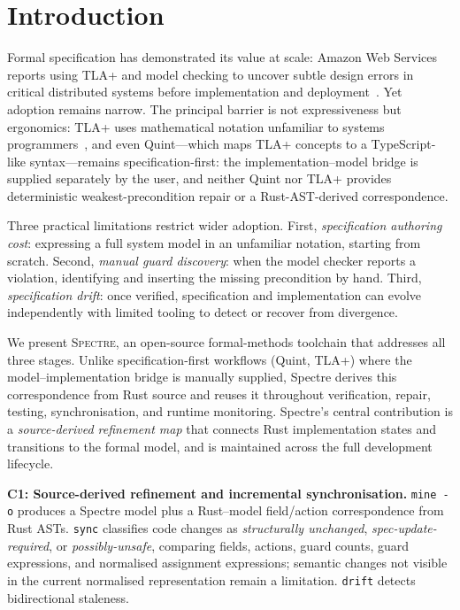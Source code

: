 \documentclass[runningheads]{llncs}
\begin{document}
\section{Introduction}\label{sec:intro}

Formal specification has demonstrated its value at scale: Amazon Web Services
reports using TLA+ and model checking to uncover subtle design errors in
critical distributed systems before implementation and deployment~\cite{newcombe2015amazon}.
Yet adoption remains narrow.
The principal barrier is not expressiveness but ergonomics: TLA+ uses
mathematical notation unfamiliar to systems programmers~\cite{wing1990specifier},
and even Quint---which maps TLA+ concepts to a TypeScript-like syntax---remains
specification-first: the implementation--model bridge is supplied separately by
the user, and neither Quint nor TLA+ provides deterministic weakest-precondition
repair or a Rust-AST-derived correspondence.

Three practical limitations restrict wider adoption.
First, \emph{specification authoring cost}: expressing a full system model in
an unfamiliar notation, starting from scratch.
Second, \emph{manual guard discovery}: when the model checker reports a
violation, identifying and inserting the missing precondition by hand.
Third, \emph{specification drift}: once verified, specification and
implementation can evolve independently with limited tooling to detect or
recover from divergence.

We present \textsc{Spectre}, an open-source formal-methods toolchain that
addresses all three stages.
Unlike specification-first workflows (Quint, TLA+) where the
model--implementation bridge is manually supplied, Spectre derives this
correspondence from Rust source and reuses it throughout verification, repair,
testing, synchronisation, and runtime monitoring.
Spectre's central contribution is a \emph{source-derived refinement map} that
connects Rust implementation states and transitions to the formal model, and is
maintained across the full development lifecycle.

\smallskip\noindent\textbf{C1: Source-derived refinement and incremental synchronisation.}
\texttt{mine -o} produces a Spectre model plus a Rust--model
field/action correspondence from Rust ASTs.
\texttt{sync} classifies code changes as \emph{structurally unchanged},
\emph{spec-update-required}, or \emph{possibly-unsafe}, comparing fields,
actions, guard counts, guard expressions, and normalised assignment expressions;
semantic changes not visible in the current normalised representation remain
a limitation.
\texttt{drift} detects bidirectional staleness.
\end{document}
